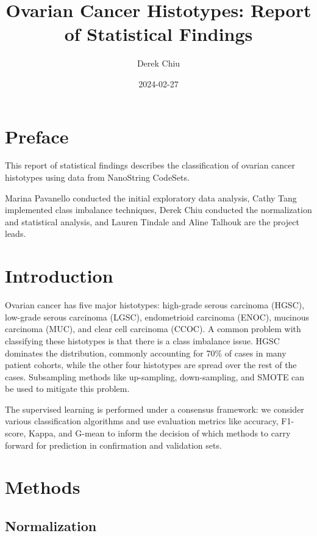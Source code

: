 \documentclass[
]{report}
\title{Ovarian Cancer Histotypes: Report of Statistical Findings}
\author{Derek Chiu}
\date{2024-02-27}
\begin{document}
\maketitle

{
\hypersetup{linkcolor=}
\setcounter{tocdepth}{1}
\tableofcontents
}
\listoffigures
\listoftables
\hypertarget{preface}{%
\chapter*{Preface}\label{preface}}

This report of statistical findings describes the classification of ovarian cancer histotypes using data from NanoString CodeSets.

Marina Pavanello conducted the initial exploratory data analysis, Cathy Tang implemented class imbalance techniques, Derek Chiu conducted the normalization and statistical analysis, and Lauren Tindale and Aline Talhouk are the project leads.

\hypertarget{introduction}{%
\chapter{Introduction}\label{introduction}}

Ovarian cancer has five major histotypes: high-grade serous carcinoma (HGSC), low-grade serous carcinoma (LGSC), endometrioid carcinoma (ENOC), mucinous carcinoma (MUC), and clear cell carcinoma (CCOC). A common problem with classifying these histotypes is that there is a class imbalance issue. HGSC dominates the distribution, commonly accounting for 70\% of cases in many patient cohorts, while the other four histotypes are spread over the rest of the cases. Subsampling methods like up-sampling, down-sampling, and SMOTE can be used to mitigate this problem.

The supervised learning is performed under a consensus framework: we consider various classification algorithms and use evaluation metrics like accuracy, F1-score, Kappa, and G-mean to inform the decision of which methods to carry forward for prediction in confirmation and validation sets.

\hypertarget{methods}{%
\chapter{Methods}\label{methods}}

\hypertarget{normalization}{%
\section{Normalization}\label{normalization}}
\end{document}

